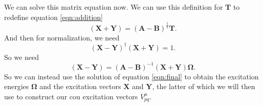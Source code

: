 \documentclass[12pt]{caltech_thesis}
\begin{document}
We can solve this matrix equation now. We can use this definition for $\textbf{T}$ to redefine equation \ref{eqn:addition} 
\begin{equation}
    (\textbf{X}+\textbf{Y}) = (\textbf{A}-\textbf{B})^{\frac{1}{2}}\textbf{T}.
\end{equation}
And then for normalization, we need
\begin{equation}
    (\textbf{X}-\textbf{Y})^{\dag}(\textbf{X}+\textbf{Y})=1.
\end{equation}
So we need
\begin{equation}
    (\textbf{X}-\textbf{Y})=(\textbf{A}-\textbf{B})^{-1}(\textbf{X}+\textbf{Y})\boldsymbol{\Omega } .
\end{equation}
So we can instead use the solution of equation \ref{eqn:final} to obtain the excitation energies $\boldsymbol{\Omega }$ and the excitation vectors $\textbf{X}$ and $\textbf{Y}$, the latter of which we will then use to construct our cou excitation vectors ${V}^{\mu}_{pq}$.
\end{document}
